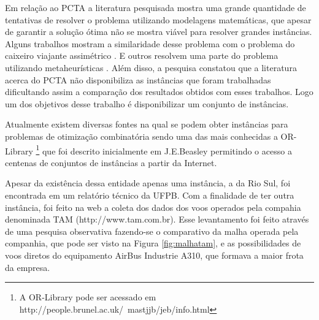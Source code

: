 Em relação ao PCTA a literatura pesquisada \cite{ahmed2009} \cite{arguelo1997}
\cite{cordeau2001} \cite{mohamed2011} \cite{abiliolivro} mostra uma grande quantidade de
tentativas de resolver o problema utilizando modelagens matemáticas, que apesar
de garantir a solução ótima não se mostra viável para resolver grandes
instâncias. Alguns trabalhos mostram a similaridade desse problema com o
problema do caixeiro viajante assimétrico \cite{clarke97}. E outros resolvem
uma parte do problema utilizando metaheurísticas \cite{arguelo1997}. Além disso,
a pesquisa constatou que a literatura acerca do PCTA não disponibiliza as
instâncias que foram trabalhadas dificultando assim a comparação dos
resultados obtidos com esses trabalhos. Logo um dos objetivos desse trabalho é
disponibilizar um conjunto de instâncias.


Atualmente existem diversas fontes na qual se podem obter instâncias para
problemas de otimização combinatória sendo uma das mais conhecidas a
OR-Library \footnote{ A OR-Library pode ser acessado em
http://people.brunel.ac.uk/~mastjjb/jeb/info.html} que foi descrito
inicialmente em J.E.Beasley \cite{orlibrary} permitindo o acesso a centenas de
conjuntos de instâncias a partir da Internet.
  
Apesar da existência dessa entidade apenas uma instância, a da Rio Sul, foi
encontrada em um relatório técnico da UFPB. Com a finalidade de ter outra
instância, foi feito na web a coleta dos dados dos voos operados pela compahia
denominada TAM (http://www.tam.com.br). Esse levantamento foi feito através de
uma pesquisa observativa fazendo-se o comparativo da malha operada pela
companhia, que pode ser visto na Figura \ref{fig:malhatam}, e as possibilidades
de voos diretos do equipamento AirBus Industrie A310, que formava a maior frota
da empresa.
	
